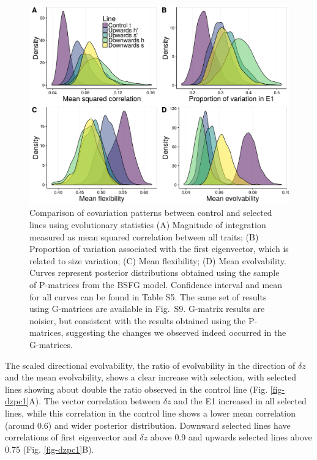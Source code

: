 \begin{refsection}
\begin{figure}     
	\centering
	\includegraphics[width=\linewidth]{chapter_ratones/media/figure3.png}
	\caption[Evolutionary statistics in selected and control lines]{     Comparison
of covariation patterns between control and selected lines using evolutionary
statistics (A) Magnitude of integration measured as mean squared correlation
between all traits; (B) Proportion of variation associated with the first
eigenvector, which is related to size variation; (C) Mean flexibility; (D) Mean
evolvability. Curves represent posterior distributions obtained using the sample
of P-matrices from the BSFG model. Confidence interval and mean for all curves
can be found in Table S5. The same set of results using G-matrices are available
in Fig.~S9. G-matrix results are noisier, but consistent with the results
obtained using the P-matrices, suggesting the changes we observed indeed
occurred in the G-matrices.}     
	\label{fig-stats} 
\end{figure}

The scaled directional evolvability, the ratio of evolvability in the
direction of \(\delta z\) and the mean evolvability, shows a clear
increase with selection, with selected lines showing about double the
ratio observed in the control line (Fig. \ref{fig-dzpc1}A). The vector
correlation between \(\delta z\) and the E1 increased in all selected
lines, while this correlation in the control line shows a lower mean
correlation (around 0.6) and wider posterior distribution. Downward
selected lines have correlations of first eigenvector and \(\delta z\)
above 0.9 and upwards selected lines above 0.75 (Fig. \ref{fig-dzpc1}B).


\end{refsection}
